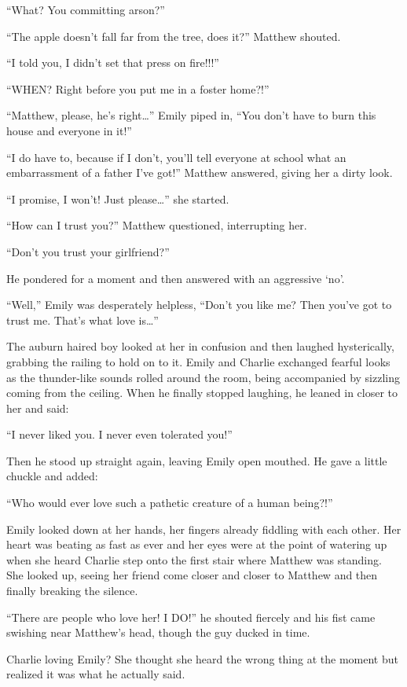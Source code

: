 “What? You committing arson?”

“The apple doesn't fall far from the tree, does it?” Matthew shouted.

“I told you, I didn't set that press on fire!!!”

“WHEN? Right before you put me in a foster home?!”

“Matthew, please, he's right…” Emily piped in, “You don't have to burn this house and everyone in it!”

“I do have to, because if I don't, you'll tell everyone at school what an embarrassment of a father I've got!” Matthew answered, giving her a dirty look.

“I promise, I won't! Just please…” she started.

“How can I trust you?” Matthew questioned, interrupting her.

“Don't you trust your girlfriend?”

He pondered for a moment and then answered with an aggressive ‘no'.

“Well,” Emily was desperately helpless, “Don't you like me? Then you've got to trust me. That's what love is…”

The auburn haired boy looked at her in confusion and then laughed hysterically, grabbing the railing to hold on to it. Emily and Charlie exchanged fearful looks as the thunder-like sounds rolled around the room, being accompanied by sizzling coming from the ceiling. When he finally stopped laughing, he leaned in closer to her and said:

“I never liked you. I never even tolerated you!”

Then he stood up straight again, leaving Emily open mouthed. He gave a little chuckle and added:

“Who would ever love such a pathetic creature of a human being?!”

Emily looked down at her hands, her fingers already fiddling with each other. Her heart was beating as fast as ever and her eyes were at the point of watering up when she heard Charlie step onto the first stair where Matthew was standing. She looked up, seeing her friend come closer and closer to Matthew and then finally breaking the silence.

“There are people who love her! I DO!” he shouted fiercely and his fist came swishing near Matthew's head, though the guy ducked in time.

Charlie loving Emily? She thought she heard the wrong thing at the moment but realized it was what he actually said.

